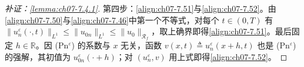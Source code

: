 ﻿\documentclass[../../main.tex]{subfiles}%
\begin{document}
\begin{proof}[补证：\cref{lemma:ch07-7.4.1}]
第四步：\eqref{align:ch07-7.51}与\eqref{align:ch07-7.52}。由\eqref{align:ch07-7.50}与\eqref{align:ch07-7.46}中第一个不等式，对每个 $t\in(0,T)$ 有 $\|u_n^\varepsilon(\cdot,t)\|_{L^1}\leqslant\|u_{0n}\|_{L^1}\leqslant\|u_0\|_{\mathscr{R}_f}$，取上确界即得\eqref{align:ch07-7.51}。最后固定 $h\in\mathbb{R}$。因 (Pn$^\varepsilon$) 的系数与 $x$ 无关，函数 $v(x,t)\triangleq u_n^\varepsilon(x+h,t)$ 也是 (Pn$^\varepsilon$) 的强解，其初值为 $u_{0n}^\varepsilon(\cdot+h)$；对 $(u_n^\varepsilon,v)$ 用上式即得\eqref{align:ch07-7.52}。
\end{proof}

\end{document}

